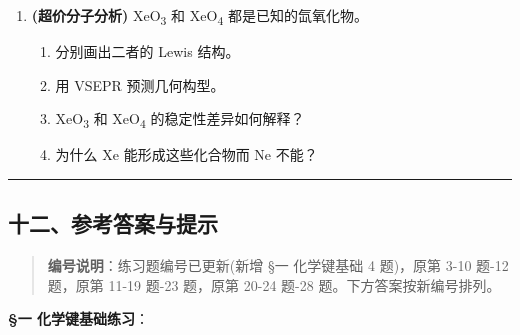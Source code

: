 \documentclass[a4paper,11pt]{ctexart}
\providecommand{\tightlist}{\setlength{\itemsep}{0pt}\setlength{\parskip}{0pt}}
\newcommand{\箭}{\ensuremath{\rightarrow}}
\newcommand{\左箭}{\ensuremath{\leftarrow}}
\newcommand{\上箭}{\ensuremath{\uparrow}}
\newcommand{\下箭}{\ensuremath{\downarrow}}
\newcommand{\衡}{\ensuremath{\rightleftharpoons}}
\newcommand{\双箭}{\ensuremath{\leftrightarrow}}
\newcommand{\约等于}{\ensuremath{\approx}}
\newcommand{\小于等于}{\ensuremath{\leq}}
\newcommand{\大于等于}{\ensuremath{\geq}}
\newcommand{\不等于}{\ensuremath{\neq}}
\newcommand{\西格马}{\ensuremath{\sigma}}
\newcommand{\派}{\ensuremath{\pi}}
\begin{document}
\begin{enumerate}
  \begin{itemize}
  \tightlist
  \item
    含一个第二周期中心原子 A 和两个相同配体 B
  \item
    A 的氧化态为 +4
  \item
    分子具有顺磁性
  \item
    总价电子数为 18
  \end{itemize}

  \begin{enumerate}
  \def\labelenumii{(\alph{enumii})}
  \tightlist
  \item
    推断 X 的可能化学式。
  \item
    画出 Lewis 结构和 MO 能级图。
  \item
    解释其顺磁性的来源。
  \end{enumerate}
\item
  \textbf{(超价分子分析)} XeO\textsubscript{3} 和 XeO\textsubscript{4} 都是已知的氙氧化物。

  \begin{enumerate}
  \def\labelenumii{(\alph{enumii})}
  \tightlist
  \item
    分别画出二者的 Lewis 结构。
  \item
    用 VSEPR 预测几何构型。
  \item
    XeO\textsubscript{3} 和 XeO\textsubscript{4} 的稳定性差异如何解释？
  \item
    为什么 Xe 能形成这些化合物而 Ne 不能？
  \end{enumerate}
\end{enumerate}

\begin{center}\rule{0.5\linewidth}{0.5pt}\end{center}

\subsection{十二、参考答案与提示}\label{ux5341ux4e8cux53c2ux8003ux7b54ux6848ux4e0eux63d0ux793a}

\begin{quote}
\textbf{编号说明}：练习题编号已更新(新增 §一 化学键基础 4 题)，原第 3-10 题-12 题，原第 11-19 题-23 题，原第 20-24 题-28 题。下方答案按新编号排列。
\end{quote}

\textbf{§一 化学键基础练习}：
\end{document}
